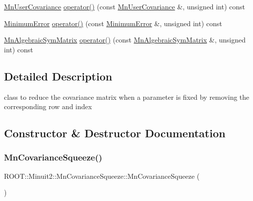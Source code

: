 \begin{DoxyCompactItemize}
\item 
\mbox{\hyperlink{classROOT_1_1Minuit2_1_1MnUserCovariance}{Mn\+User\+Covariance}} \mbox{\hyperlink{classROOT_1_1Minuit2_1_1MnCovarianceSqueeze_af75da2b8e6e20a5477a6b0ceac4efb3a}{operator()}} (const \mbox{\hyperlink{classROOT_1_1Minuit2_1_1MnUserCovariance}{Mn\+User\+Covariance}} \&, unsigned int) const
\item 
\mbox{\hyperlink{classROOT_1_1Minuit2_1_1MinimumError}{Minimum\+Error}} \mbox{\hyperlink{classROOT_1_1Minuit2_1_1MnCovarianceSqueeze_a6f1ea9726d0981faacf7ee0c26326bcd}{operator()}} (const \mbox{\hyperlink{classROOT_1_1Minuit2_1_1MinimumError}{Minimum\+Error}} \&, unsigned int) const
\item 
\mbox{\hyperlink{namespaceROOT_1_1Minuit2_a9e74ad97f5537a2e80e52b04d98ecc6e}{Mn\+Algebraic\+Sym\+Matrix}} \mbox{\hyperlink{classROOT_1_1Minuit2_1_1MnCovarianceSqueeze_a3271676361fc2c88dad2037f40479fab}{operator()}} (const \mbox{\hyperlink{namespaceROOT_1_1Minuit2_a9e74ad97f5537a2e80e52b04d98ecc6e}{Mn\+Algebraic\+Sym\+Matrix}} \&, unsigned int) const
\end{DoxyCompactItemize}


\subsection{Detailed Description}
class to reduce the covariance matrix when a parameter is fixed by removing the corresponding row and index 

\subsection{Constructor \& Destructor Documentation}
\mbox{\label{classROOT_1_1Minuit2_1_1MnCovarianceSqueeze_a865c0aed477be8c5177745181d4cf200}} 
\subsubsection{\texorpdfstring{MnCovarianceSqueeze()}{MnCovarianceSqueeze()}\hspace{0.1cm}{\footnotesize\ttfamily [1/2]}}
{\footnotesize\ttfamily R\+O\+O\+T\+::\+Minuit2\+::\+Mn\+Covariance\+Squeeze\+::\+Mn\+Covariance\+Squeeze (\begin{DoxyParamCaption}{ }\end{DoxyParamCaption})\hspace{0.3cm}{\ttfamily [inline]}}

